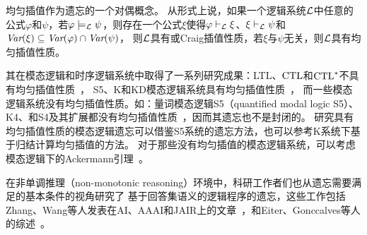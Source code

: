 均匀插值作为遗忘的一个对偶概念。
从形式上说，如果一个逻辑系统${\cal L}$中任意的公式$\varphi$和$\psi$，若$\varphi\models_{\cal L} \psi$，则存在一个公式$\xi$使得$\varphi\vdash_{\cal L}\xi$、$\xi\vdash_{\cal L}\psi$和 $\textit{Var}(\xi)\subseteq \textit{Var}(\varphi)\cap \textit{Var}(\psi)$，
则${\cal L}$具有或Craig插值性质，若$\xi$与$\psi$无关，则${\cal L}$具有均匀插值性质。

其在模态逻辑和时序逻辑系统中取得了一系列研究成果：LTL、$\textrm{CTL}$和$\textrm{CTL}^*$不具有均匀插值性质~\cite{Maksimova:JANCL:1991,DAgostino:synthese:2008}，
S5、K和KD模态逻辑系统具有均匀插值性质~\cite{DBLP:journals/aml/Iemhoff19}，
而一些模态逻辑系统没有均匀插值性质。如：量词模态逻辑S5（quantified modal logic S5）\cite{DBLP:journals/jsyml/Fine79}、K4、和S4及其扩展都没有均匀插值性质~\cite{DBLP:journals/ndjfl/Schumm86}，因而其遗忘也不是封闭的。
研究具有均匀插值性质的模态逻辑遗忘可以借鉴S5系统的遗忘方法，也可以参考K系统下基于归结计算均匀插值的方法。
对于那些没有均匀插值的模态逻辑系统，可以考虑模态逻辑下的Ackermann引理~\cite{DBLP:books/daglib/0023036}。




在非单调推理（non-monotonic reasoning）环境中，科研工作者们也从遗忘需要满足的基本条件的视角研究了
基于回答集语义的逻辑程序的遗忘，这些工作包括Zhang、Wang等人发表在AI、AAAI和JAIR上的文章~\cite{DBLP:Zhang:AIJ2006,DBLP:journals/ai/EiterW08,Wong:PhD:Thesis,DBLP:journals/jair/WangZZZ14,wang2013forgetting,DBLP:conf/aaai/WangWWZ15,DBLP:journals/jair/Delgrande17,gonccalves2020limits}，和Eiter、Gonccalves等人的综述~\cite{eiter2019brief,gonccalves2021forgetting}。


